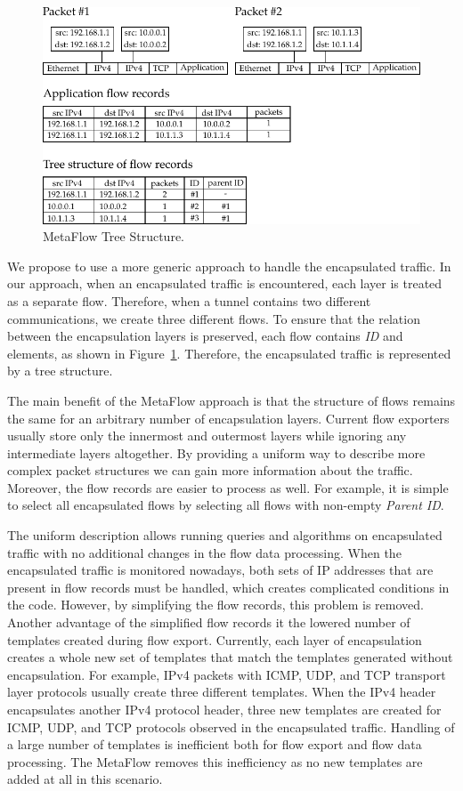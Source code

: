 \begin{figure}[!tb]
    \centering 
    \includegraphics{figures/metaflow}
    \caption{MetaFlow Tree Structure.}
    \label{fig:metaflow}
\end{figure}

We propose to use a more generic approach to handle the encapsulated traffic. In our approach, when an encapsulated traffic is encountered, each layer is treated as a separate flow. Therefore, when a tunnel contains two different communications, we create three different flows. To ensure that the relation between the encapsulation layers is preserved, each flow contains \emph{ID} and  elements, as shown in Figure~\ref{fig:metaflow}. Therefore, the encapsulated traffic is represented by a tree structure.

The main benefit of the MetaFlow approach is that the structure of flows remains the same for an arbitrary number of encapsulation layers. Current flow exporters usually store only the innermost and outermost layers while ignoring any intermediate layers altogether. By providing a uniform way to describe more complex packet structures we can gain more information about the traffic. Moreover, the flow records are easier to process as well. For example, it is simple to select all encapsulated flows by selecting all flows with non-empty \emph{Parent ID}.

The uniform description allows running queries and algorithms on encapsulated traffic with no additional changes in the flow data processing. When the encapsulated traffic is monitored nowadays, both sets of IP addresses that are present in flow records must be handled, which creates complicated conditions in the code. However, by simplifying the flow records, this problem is removed. Another advantage of the simplified flow records it the lowered number of templates created during flow export. Currently, each layer of encapsulation creates a whole new set of templates that match the templates generated without encapsulation. For example, IPv4 packets with ICMP, UDP, and TCP transport layer protocols usually create three different templates. When the IPv4 header encapsulates another IPv4 protocol header, three new templates are created for ICMP, UDP, and TCP protocols observed in the encapsulated traffic. Handling of a large number of templates is inefficient both for flow export and flow data processing. The MetaFlow removes this inefficiency as no new templates are added at all in this scenario.

